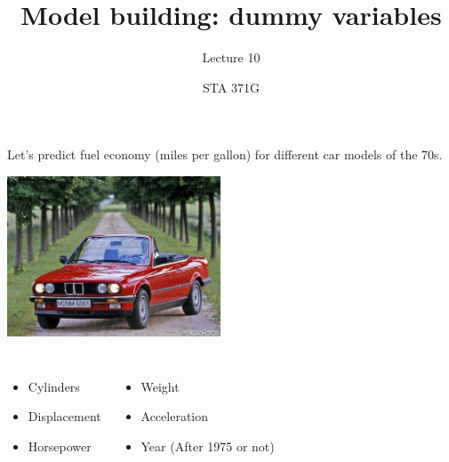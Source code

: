 \documentclass{beamer}\usepackage[]{graphicx}\usepackage[]{color}
\title{Model building: dummy variables}
\subtitle{Lecture 10}
\author{STA 371G}
\begin{document}
  
  
  

  \frame{\maketitle}



  \begin{darkframes}
    \begin{frame}
      Let's predict fuel economy (miles per gallon) for different car models of the 70s.

      \begin{center}
        \includegraphics[width=2.5in]{bmw} \\
      \end{center} \pause

      \begin{columns}[onlytextwidth]
          \begin{itemize}
            \item Cylinders
            \item Displacement
            \item Horsepower
          \end{itemize}
          \begin{itemize}
            \item Weight
            \item Acceleration
            \item Year (After 1975 or not)
          \end{itemize}
      \end{columns}
    \end{frame}


\end{darkframes}
\end{document}

